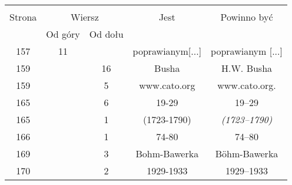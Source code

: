 \documentclass[a4paper,11pt]{article}
\begin{document}
\begin{center}

  \begin{tabular}{|c|c|c|c|c|}
    \hline
    & \multicolumn{2}{c|}{} & & \\
    Strona & \multicolumn{2}{c|}{Wiersz} & Jest
                              & Powinno być \\ \cline{2-3}
    & Od góry & Od dołu & & \\
    \hline
    157 & 11 & & poprawianym[...] & poprawianym [...] \\
    159 & & 16 & Busha & H.W. Busha \\
    159 & &  5 & www.cato.org & www.cato.org. \\
    165 & &  6 & 19-29 & 19--29 \\
    165 & &  1 & (1723-1790) & \textit{(1723--1790)} \\
    166 & &  1 & 74-80 & 74--80 \\
    169 & &  3 & Bohm-Bawerka & B\"{o}hm-Bawerka \\
    170 & &  2 & 1929-1933 & 1929--1933 \\
    \hline
  \end{tabular}






\end{center}
\end{document}

